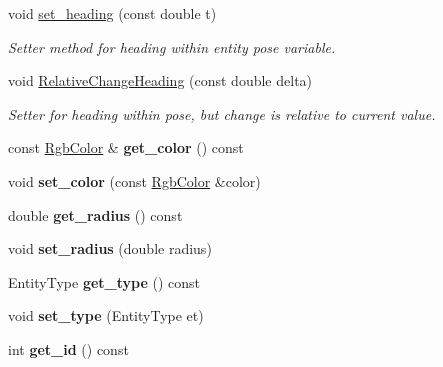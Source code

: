 \begin{DoxyCompactItemize}
void \mbox{\hyperlink{class_arena_entity_ac1cc3c6997bc7a9573128fc5ded9eb72}{set\+\_\+heading}} (const double t)
\begin{DoxyCompactList}\small\item\em Setter method for heading within entity pose variable. \end{DoxyCompactList}\item 
void \mbox{\hyperlink{class_arena_entity_a4c4bd7f5ffb778979303c33cb3bc9986}{Relative\+Change\+Heading}} (const double delta)
\begin{DoxyCompactList}\small\item\em Setter for heading within pose, but change is relative to current value. \end{DoxyCompactList}\item 
\mbox{\label{class_arena_entity_a5790a5d45229aa76223a8183ac916323}} 
const \mbox{\hyperlink{struct_rgb_color}{Rgb\+Color}} \& {\bfseries get\+\_\+color} () const
\item 
\mbox{\label{class_arena_entity_a1ac33beda7462ac5c7f4f71a70d3fb10}} 
void {\bfseries set\+\_\+color} (const \mbox{\hyperlink{struct_rgb_color}{Rgb\+Color}} \&color)
\item 
\mbox{\label{class_arena_entity_a42d86d2d952b7f2a861d8a6cb46e661e}} 
double {\bfseries get\+\_\+radius} () const
\item 
\mbox{\label{class_arena_entity_a2b0c2512fe53d143442da5e357f71505}} 
void {\bfseries set\+\_\+radius} (double radius)
\item 
\mbox{\label{class_arena_entity_a19e75df5ce971f48e9a522a343a39fb3}} 
Entity\+Type {\bfseries get\+\_\+type} () const
\item 
\mbox{\label{class_arena_entity_aa65c584906d4c22f61488fab98c3392c}} 
void {\bfseries set\+\_\+type} (Entity\+Type et)
\item 
\mbox{\label{class_arena_entity_ae50750dfde8118c27835ea8e9db8b7ef}} 
int {\bfseries get\+\_\+id} () const
\item 
\mbox{\label{class_arena_entity_a67f4c0467d32eec76ee6ed033ff9ed2f}} 

\end{DoxyCompactItemize}
